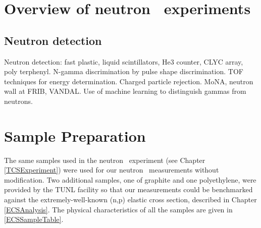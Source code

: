 \section{Overview of neutron \el\ experiments}
\subsection{Neutron detection}
Neutron detection: fast plastic, liquid scintillators, He3 counter, CLYC array, poly
terphenyl. N-gamma discrimination by pulse shape discrimination. TOF techniques
for energy determination. Charged particle rejection. MoNA, neutron wall at
FRIB, VANDAL. Use of machine learning to distinguish gammas from neutrons.

\section{Sample Preparation}
The same \snTwelveNatFour samples used in the neutron \tot\ experiment (see Chapter
\ref{TCSExperiment}) were used for our neutron
\el\ measurements without modification. Two additional samples, one of graphite and one
polyethylene, were provided by the TUNL facility so that our measurements could be benchmarked
against the extremely-well-known (n,p) elastic cross section, described in Chapter \ref{ECSAnalysis}.
The physical characteristics of all the samples are given in \ref{ECSSampleTable}.

